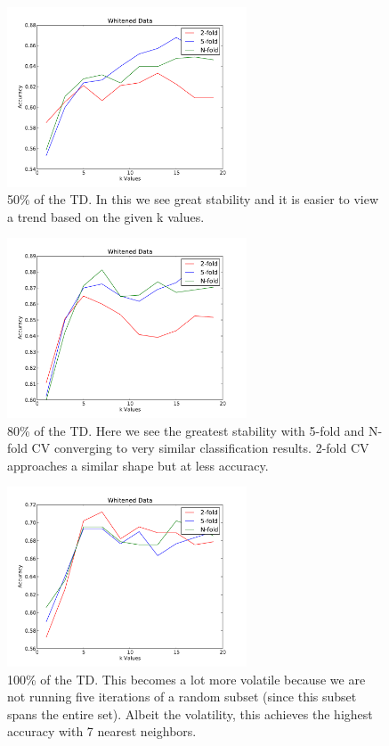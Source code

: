 \documentclass[conference]{acmsiggraph}
\begin{document}
\begin{figure}[h]
  \centering
  \includegraphics[width=2.8in]{images/alc_w_50.pdf}
  \caption{50\% of the TD. In this we see great stability and it is easier to view a trend based on the given k values.}
\end{figure}
\begin{figure}[h]
  \centering
  \includegraphics[width=2.8in]{images/alc_w_80.pdf}
  \caption{80\% of the TD. Here we see the greatest stability with 5-fold and N-fold CV converging to very similar classification results. 2-fold CV approaches a similar shape but at less accuracy.}
\end{figure}
\begin{figure}[t]
  \centering
  \includegraphics[width=2.8in]{images/alc_w_100.pdf}
  \caption{100\% of the TD. This becomes a lot more volatile because we are not running five iterations of a random subset (since this subset spans the entire set). Albeit the volatility, this achieves the highest accuracy with 7 nearest neighbors.}
\end{figure}
\end{document}
